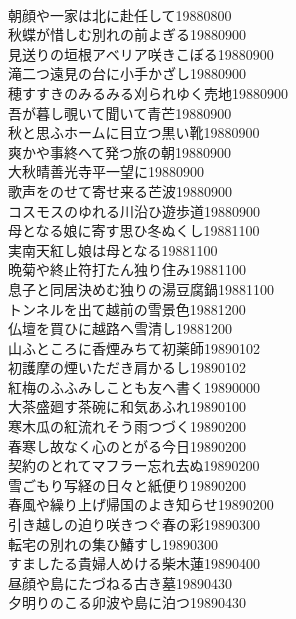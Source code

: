 \begin{multicols}{2}
\\朝顔や一家は北に赴任して\hfill{19880800}
\\秋蝶が惜しむ別れの前よぎる\hfill{19880900}
\\見送りの垣根アベリア咲きこぼる\hfill{19880900}
\\滝二つ遠見の台に小手かざし\hfill{19880900}
\\穂すすきのみるみる刈られゆく売地\hfill{19880900}
\\吾が暮し覗いて聞いて青芒\hfill{19880900}
\\秋と思ふホームに目立つ黒い靴\hfill{19880900}
\\爽かや事終へて発つ旅の朝\hfill{19880900}
\\大秋晴善光寺平一望に\hfill{19880900}
\\歌声をのせて寄せ来る芒波\hfill{19880900}
\\コスモスのゆれる川沿ひ遊歩道\hfill{19880900}
\\母となる娘に寄す思ひ冬ぬくし\hfill{19881100}
\\実南天紅し娘は母となる\hfill{19881100}
\\晩菊や終止符打たん独り住み\hfill{19881100}
\\息子と同居決めむ独りの湯豆腐鍋\hfill{19881100}
\\トンネルを出て越前の雪景色\hfill{19881200}
\\仏壇を買ひに越路へ雪清し\hfill{19881200}
\\山ふところに香煙みちて初薬師\hfill{19890102}
\\初護摩の煙いただき肩かるし\hfill{19890102}
\\紅梅のふふみしことも友へ書く\hfill{19890000}
\\大茶盛廻す茶碗に和気あふれ\hfill{19890100}
\\寒木瓜の紅流れそう雨つづく\hfill{19890200}
\\春寒し故なく心のとがる今日\hfill{19890200}
\\契約のとれてマフラー忘れ去ぬ\hfill{19890200}
\\雪ごもり写経の日々と紙便り\hfill{19890200}
\\春風や繰り上げ帰国のよき知らせ\hfill{19890200}
\\引き越しの迫り咲きつぐ春の彩\hfill{19890300}
\\転宅の別れの集ひ鰆すし\hfill{19890300}
\\すましたる貴婦人めける柴木蓮\hfill{19890400}
\\昼顔や島にたづねる古き墓\hfill{19890430}
\\夕明りのこる卯波や島に泊つ\hfill{19890430}

\end{multicols}

